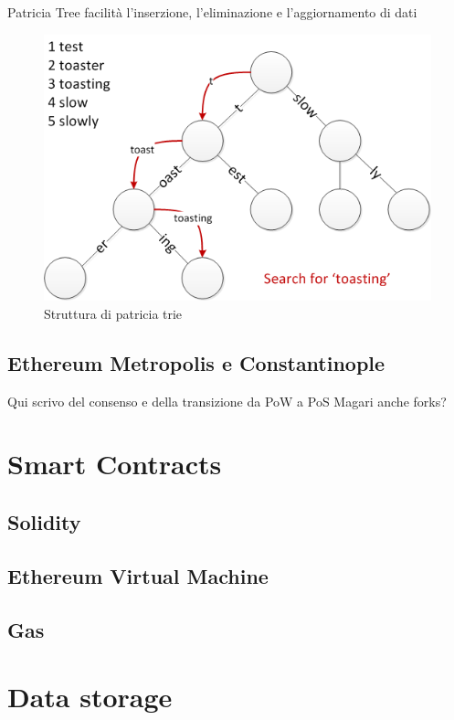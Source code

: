 Patricia Tree facilità l'inserzione, l'eliminazione e l'aggiornamento di dati



\begin{figure}[H]
\centering
\includegraphics[width=1\textwidth]{immagini/patricia_trie.png}
\caption{Struttura di patricia trie}
\label{fig:mesh6}
\end{figure}

\subsection{Ethereum Metropolis e Constantinople}

Qui scrivo del consenso e della transizione da PoW a PoS
Magari anche forks?

\section{Smart Contracts}

\subsection{Solidity}

\subsection{Ethereum Virtual Machine}

\subsection{Gas}

\section{Data storage}